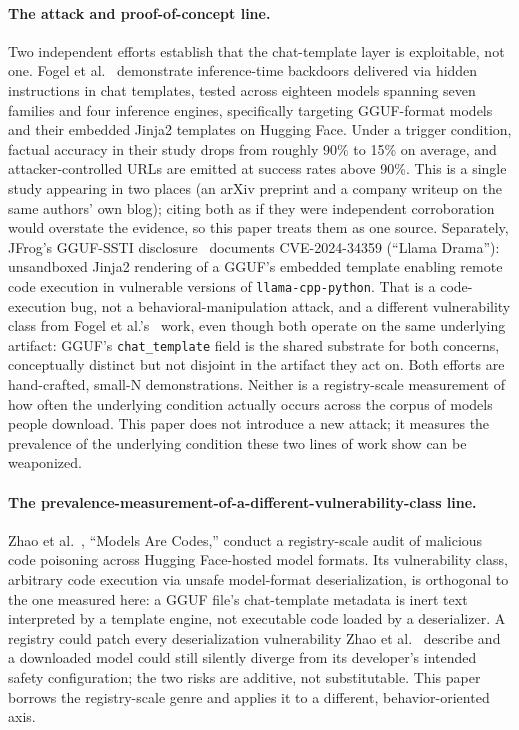 \documentclass[letterpaper,twocolumn,10pt]{article}
\begin{document}
\paragraph{The attack and proof-of-concept line.} Two independent efforts establish that the chat-template layer is exploitable, not one. Fogel et al.~\cite{fogel2026inference} demonstrate inference-time backdoors delivered via hidden instructions in chat templates, tested across eighteen models spanning seven families and four inference engines, specifically targeting GGUF-format models and their embedded Jinja2 templates on Hugging Face. Under a trigger condition, factual accuracy in their study drops from roughly 90\% to 15\% on average, and attacker-controlled URLs are emitted at success rates above 90\%. This is a single study appearing in two places (an arXiv preprint and a company writeup on the same authors' own blog); citing both as if they were independent corroboration would overstate the evidence, so this paper treats them as one source. Separately, JFrog's GGUF-SSTI disclosure~\cite{jfrog2024ggufssti} documents CVE-2024-34359 (``Llama Drama''): unsandboxed Jinja2 rendering of a GGUF's embedded template enabling remote code execution in vulnerable versions of \texttt{llama-cpp-python}. That is a code-execution bug, not a behavioral-manipulation attack, and a different vulnerability class from Fogel et al.'s~\cite{fogel2026inference} work, even though both operate on the same underlying artifact: GGUF's \texttt{chat\_template} field is the shared substrate for both concerns, conceptually distinct but not disjoint in the artifact they act on. Both efforts are hand-crafted, small-N demonstrations. Neither is a registry-scale measurement of how often the underlying condition actually occurs across the corpus of models people download. This paper does not introduce a new attack; it measures the prevalence of the underlying condition these two lines of work show can be weaponized.

\paragraph{The prevalence-measurement-of-a-different-vulnerability-class line.} Zhao et al.~\cite{zhao2024models}, ``Models Are Codes,'' conduct a registry-scale audit of malicious code poisoning across Hugging Face-hosted model formats. Its vulnerability class, arbitrary code execution via unsafe model-format deserialization, is orthogonal to the one measured here: a GGUF file's chat-template metadata is inert text interpreted by a template engine, not executable code loaded by a deserializer. A registry could patch every deserialization vulnerability Zhao et al.~\cite{zhao2024models} describe and a downloaded model could still silently diverge from its developer's intended safety configuration; the two risks are additive, not substitutable. This paper borrows the registry-scale genre and applies it to a different, behavior-oriented axis.
\end{document}
